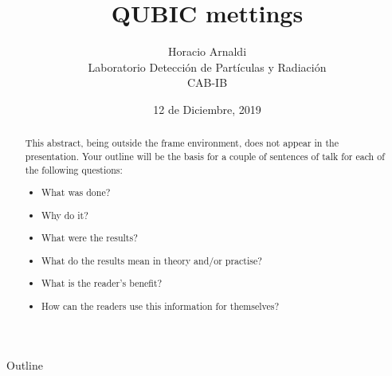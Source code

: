 \documentclass[ignorenonframetext,12pt]{beamer}
\title{QUBIC mettings}
\author{Horacio Arnaldi\\
Laboratorio Detecci\'on de Part\'iculas y Radiaci\'on\\
CAB-IB}
\date{12 de Diciembre, 2019}
\begin{document}
\begin{frame}
				\maketitle
\end{frame}

\begin{abstract}
				This abstract, being outside the frame environment, does not appear in the presentation.  Your outline will be the basis for a couple of sentences of talk for each of the following questions:
				\begin{itemize}
								\item What was done?
								\item Why do it?
								\item What were the results?
								\item What do the results mean in theory and/or practise?
								\item What is the reader's benefit?
								\item How can the readers use this information for themselves? 
				\end{itemize}
\end{abstract}


\begin{frame}{Outline}
				\tableofcontents
\end{frame}
\end{document}
